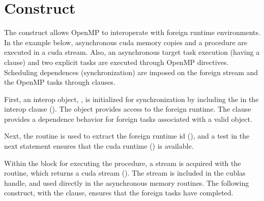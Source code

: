 \section{ Construct}
\label{sec:interop}

The  construct allows OpenMP to interoperate with foreign runtime environments.
In the example below, asynchronous cuda memory copies and a  procedure are executed 
in a cuda stream. Also, an asynchronous target task execution (having a  clause) 
and two explicit tasks are executed through OpenMP directives.  Scheduling dependences (synchronization) are
imposed on the foreign stream and the OpenMP tasks through  clauses. 

First, an interop object, , is initialized for synchronization by including the
  in the interop  clause 
().  
The object provides access to the foreign runtime.
The  clause provides a dependence behavior
for foreign tasks associated with a valid object.

Next, the  routine is used to extract the foreign 
runtime id (), and a test in the next statement ensures 
that the cuda runtime () is available.

Within the block for executing the  procedure, a stream is acquired 
with the  routine, which returns a cuda stream ().
The stream is included in the cublas handle, and used directly in the asynchronous memory
routines.  The following  construct, with the  clause, 
ensures that the foreign tasks have completed.

